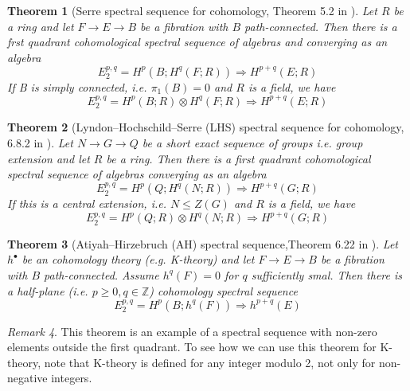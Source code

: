 \documentclass[a4paper,11pt]{article}
\newtheorem{theorem}{Theorem}[section]
\theoremstyle{definition}
\theoremstyle{remark}
\newtheorem{remark}[theorem]{Remark}
\begin{document}
\begin{theorem}
	[Serre spectral sequence for cohomology, Theorem 5.2 in \cite{mccleary2001user}] Let $R$ be a ring and let $F\to E\to B$ be a fibration with $B$ path-connected. Then there is a frst quadrant cohomological spectral sequence of algebras and converging as an algebra
	\begin{equation}
		E^{p,q}_2=H^p(B;H^q(F;R))\Rightarrow H^{p+q}(E;R)
	\end{equation}
	If B is simply connected, i.e. $\pi_1(B)=0$ and $R$ is a field, we have
	\begin{equation}
		E^{p,q}_2=H^p(B;R)\otimes H^q(F;R)\Rightarrow H^{p+q}(E;R)
	\end{equation}
\end{theorem}
\begin{theorem}[Lyndon--Hochschild--Serre (LHS) spectral sequence for cohomology, 6.8.2 in \cite{weibel1994introduction}] Let $N\to G\to Q$ be a short exact sequence of groups i.e. group extension and let $R$ be a ring. Then there is a first quadrant cohomological spectral sequence of algebras converging as an algebra
	\begin{equation}
		E^{p,q}_2=H^p(Q;H^q(N;R))\Rightarrow H^{p+q}(G;R)
	\end{equation}
	If this is a central extension, i.e. $N\leq Z(G)$ and $R$ is a field, we have
	\begin{equation}
		E^{p,q}_2=H^p(Q;R)\otimes H^q(N;R)\Rightarrow H^{p+q}(G;R)
	\end{equation}
\end{theorem}
\begin{theorem}
	[Atiyah--Hirzebruch (AH) spectral sequence,Theorem 6.22 in \cite{davis2001lecture}] Let $h^\bullet$ be an cohomology theory (e.g. K-theory) and let $F\to E\to B$ be a fibration with $B$ path-connected. Assume $h^q(F)=0$ for $q$ sufficiently smal. Then there is a half-plane (i.e. $p\geq 0,q\in\mathbb{Z}$) cohomology spectral sequence
	\begin{equation}
		E_2^{p,q}=H^p(B;h^q(F))\Rightarrow h^{p+q}(E)
	\end{equation} 
\end{theorem}
\begin{remark}
	This theorem is an example of a spectral sequence with non-zero elements outside the first quadrant. To see how we can use this theorem for K-theory, note that K-theory is defined for any integer modulo 2, not only for non-negative integers. 
\end{remark}
\end{document}

